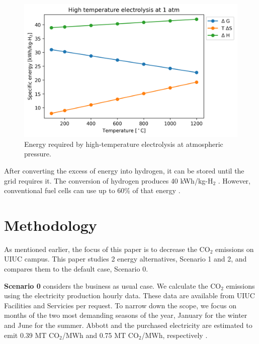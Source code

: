 \documentclass{anstrans}
\begin{document}
\begin{figure}[htbp!] %
    \centering
    \includegraphics[width=0.90\linewidth]{figures/hte-energy}
    \hfill
    \caption{Energy required by high-temperature electrolysis at atmospheric pressure.}
    \label{fig:hte-energy}
\end{figure}

After converting the excess of energy into hydrogen, it can be stored until the grid requires it.
The conversion of hydrogen produces 40 kWh/kg-H$_2$ \cite{ursua_hydrogen_2012}.
However, conventional fuel cells can use up to 60\% of that energy \cite{doe_energy_fuel_2015}.



\section{Methodology}

As mentioned earlier, the focus of this paper is to decrease the CO$_2$ emissions on UIUC campus.
This paper studies 2 energy alternatives, Scenario 1 and 2, and compares them to the default case, Scenario 0.

\textbf{Scenario 0} considers the business as usual case.
We calculate the CO$_2$ emissions using the electricity production hourly data.
These data are available from UIUC Facilities and Servicies per request.
To narrow down the scope, we focus on months of the two most demanding seasons of the year, January for the winter and June for the summer.
Abbott and the purchased electricity are estimated to emit 0.39 MT CO$_2$/MWh and 0.75 MT CO$_2$/MWh, respectively \cite{isee_illinois_2015, isee_illinois_2020}.
\end{document}
